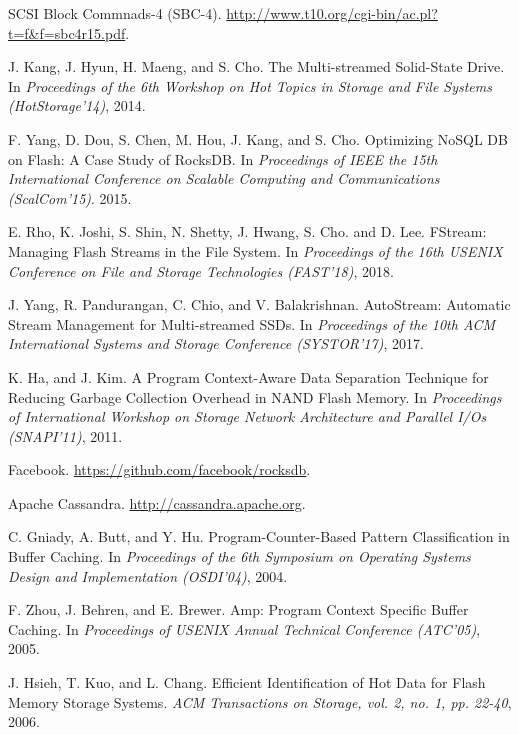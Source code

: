 \newpage


\begin{thebibliography}{00}

SCSI Block Commnads-4 (SBC-4).
\url{http://www.t10.org/cgi-bin/ac.pl?t=f&f=sbc4r15.pdf}.

J. Kang, J. Hyun, H. Maeng, and S. Cho. 
The Multi-streamed Solid-State Drive.
In \textit{Proceedings of the 6th Workshop on Hot Topics in Storage and File Systems (HotStorage'14)}, 2014.

F. Yang, D. Dou, S. Chen, M. Hou, J. Kang, and S. Cho.
Optimizing NoSQL DB on Flash: A Case Study of RocksDB.
In \textit{Proceedings of IEEE the 15th International Conference on Scalable Computing
and Communications (ScalCom'15)}. 2015.

E. Rho, K. Joshi, S. Shin, N. Shetty, J. Hwang, S. Cho. and D. Lee. 
FStream: Managing Flash Streams in the File System.
In \textit{Proceedings of the 16th USENIX Conference on File and Storage Technologies (FAST'18)}, 2018.

J. Yang, R. Pandurangan, C. Chio, and V. Balakrishnan.
AutoStream: Automatic Stream Management for Multi-streamed SSDs.
In \textit{Proceedings of the 10th ACM International Systems and Storage Conference (SYSTOR'17)}, 2017.

K. Ha, and J. Kim.
A Program Context-Aware Data Separation Technique for Reducing Garbage Collection Overhead in NAND Flash Memory.
In \textit{Proceedings of International Workshop on Storage Network Architecture 
and Parallel I/Os (SNAPI'11)}, 2011.

Facebook. 
\url{https://github.com/facebook/rocksdb}.

Apache Cassandra. 
\url{http://cassandra.apache.org}.

C. Gniady, A. Butt, and Y. Hu.
Program-Counter-Based Pattern Classification in Buffer Caching.
In \textit{Proceedings of the 6th Symposium on Operating Systems Design and Implementation (OSDI'04)}, 2004.

F. Zhou, J. Behren, and E. Brewer.
Amp: Program Context Specific Buffer Caching.
In \textit{Proceedings of USENIX Annual Technical Conference (ATC'05)}, 2005.

J. Hsieh, T. Kuo, and L. Chang.
Efficient Identification of Hot Data for Flash Memory Storage Systems.
\textit{ACM Transactions on Storage, vol. 2, no. 1, pp. 22-40}, 2006.


\end{thebibliography}
